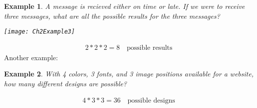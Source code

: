 \documentclass[../IND E 315.tex]{subfiles}
\newtheorem{exmp}{Example}
\begin{document}
\begin{exmp}
    A message is recieved either on time or late. If we were to receive three messages, what are all the possible results for the three messages?
    \begin{center}
        \texttt{[image: Ch2Example3]}
    \end{center}
\end{exmp}
\begin{equation*}
    \begin{aligned}
        2 * 2 * 2 = 8 \quad \text{possible results}
    \end{aligned}
\end{equation*}
Another example:
\begin{exmp}
    With 4 colors, 3 fonts, and 3 image positions available for a website, how many different designs are possible? 
\end{exmp}
\begin{equation*}
    \begin{aligned}
        4 * 3 * 3 = 36 \quad \text{possible designs}
    \end{aligned}
\end{equation*}
\end{document}

